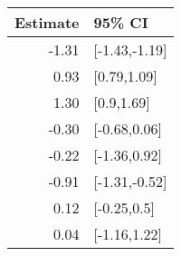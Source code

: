 \begin{tabular}{rl}
  \hline
Estimate & 95\% CI \\ 
  \hline
-1.31 & [-1.43,-1.19] \\ 
  0.93 & [0.79,1.09] \\ 
  1.30 & [0.9,1.69] \\ 
  -0.30 & [-0.68,0.06] \\ 
  -0.22 & [-1.36,0.92] \\ 
  -0.91 & [-1.31,-0.52] \\ 
  0.12 & [-0.25,0.5] \\ 
  0.04 & [-1.16,1.22] \\ 
   \hline
\end{tabular}

